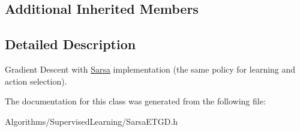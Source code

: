 \subsection*{Additional Inherited Members}


\subsection{Detailed Description}
Gradient Descent with \hyperlink{classAI_1_1Algorithm_1_1Sarsa}{Sarsa} implementation (the same policy for learning and action selection). 

The documentation for this class was generated from the following file\+:\begin{DoxyCompactItemize}
\item 
Algorithms/\+Supervised\+Learning/Sarsa\+E\+T\+G\+D.\+h\end{DoxyCompactItemize}

